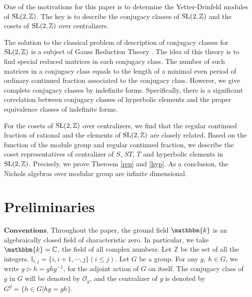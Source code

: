 \documentclass{amsproc}
\theoremstyle{definition}
\theoremstyle{remark}
\numberwithin{equation}{section}
\begin{document}
One of the motivations for this paper is to determine the Yetter-Drinfeld modules of $\rm{SL(2,\mathbb{Z})}$.
The key is to describe  the conjugacy classes of $\rm{SL(2,\mathbb{Z})}$ and the cosets of $\rm{SL(2,\mathbb{Z})}$ over centralizers.

The solution to the classical problem of description of conjugacy classes for $\rm{SL(2,\mathbb{Z})}$
 is a subject of Gauss Reduction Theory  \cite{K}.
The idea of this theory is to find special reduced matrices
in each conjugacy class. The number of such matrices in a conjugacy class equals to the
length of a minimal even period of ordinary continued fraction associated to the conjugacy
class. Howerer, we give  complete conjugacy classes by indeﬁnite forms.
Specifically, there is a significant correlation between conjugacy classes of hyperbolic
elements and the proper equivalence classes of indeﬁnite forms.


For the cosets of $\rm{SL(2,\mathbb{Z})}$ over centralizers, we find that the regular continued fraction of rational 
and the elements of $\rm{SL(2,\mathbb{Z})}$ are closely related.
Based on the function of the module group and regular continued fraction,
we describe the coset representatives of centralizer of $S$, $ST$, $T$ and hyperbolic
elements in $\rm{SL(2,\mathbb{Z})}$.
Precisely, we prove Theroem \ref{rep} and \ref{hyp}.
As a conclusion, the Nichols algebras over modular group  are infinite dimensional.












\section{Preliminaries}


\noindent$\mathbf{Conventions}$.
Throughout the paper, the ground field $\mathbbm{k}$ is an algebraically closed field of characteristic zero.
In particular, we take  $\mathbbm{k}=\mathbb{C}$, the field of all complex numbers.
Let  $\mathbb{Z}$ be the set of  all the integers. 
$\mathbb{I}_{i,j}=\{i,i+1,\cdots,j\}(i\leq j)$.
Let $G$ be a group.
For any $g,\ h\in G$, we write $g\vartriangleright h=ghg^{-1}$, for
the adjoint action of $G$ on itself. The conjugacy class of $g$ in $G$ will be denoted by $\mathcal{O}_g$,
 and the centralizer of $g$ is denoted by $G^g=\{h\in G|hg=gh\}$.
\end{document}
